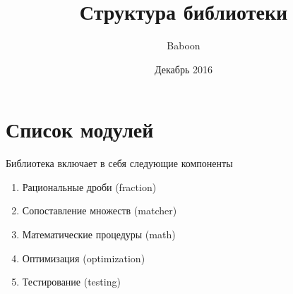 \documentclass{article}
\title{Структура библиотеки}
\author{Baboon}
\date{Декабрь 2016}
\begin{document}
\maketitle

\section{Список модулей}

Библиотека включает в себя следующие компоненты

\begin{enumerate}
\item Рациональные дроби (fraction)
\item Сопоставление множеств (matcher)
\item Математические процедуры (math)
\item Оптимизация (optimization)
\item Тестирование (testing)
\end{enumerate}
\end{document}
